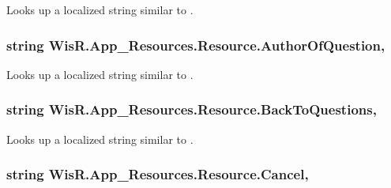 Looks up a localized string similar to . 

\hypertarget{class_wis_r_1_1_app___resources_1_1_resource_a17797cf5a9a93888aba1591bf0fc0d26}{}
\subsubsection[{Author\+Of\+Question}]{\setlength{\rightskip}{0pt plus 5cm}string Wis\+R.\+App\+\_\+\+Resources.\+Resource.\+Author\+Of\+Question\hspace{0.3cm}{\ttfamily [static]}, {\ttfamily [get]}}\label{class_wis_r_1_1_app___resources_1_1_resource_a17797cf5a9a93888aba1591bf0fc0d26}


Looks up a localized string similar to . 

\hypertarget{class_wis_r_1_1_app___resources_1_1_resource_a976b25d7e04e7cb755a4c744ba196679}{}
\subsubsection[{Back\+To\+Questions}]{\setlength{\rightskip}{0pt plus 5cm}string Wis\+R.\+App\+\_\+\+Resources.\+Resource.\+Back\+To\+Questions\hspace{0.3cm}{\ttfamily [static]}, {\ttfamily [get]}}\label{class_wis_r_1_1_app___resources_1_1_resource_a976b25d7e04e7cb755a4c744ba196679}


Looks up a localized string similar to . 

\hypertarget{class_wis_r_1_1_app___resources_1_1_resource_ad840677aeb5f66405a6c007d12d0aaf1}{}
\subsubsection[{Cancel}]{\setlength{\rightskip}{0pt plus 5cm}string Wis\+R.\+App\+\_\+\+Resources.\+Resource.\+Cancel\hspace{0.3cm}{\ttfamily [static]}, {\ttfamily [get]}}\label{class_wis_r_1_1_app___resources_1_1_resource_ad840677aeb5f66405a6c007d12d0aaf1}


